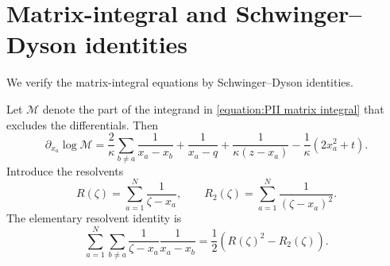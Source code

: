 \documentclass[a4paper,11pt]{article}
\numberwithin{equation}{section}
\begin{document}
\appendix

\section{Matrix-integral and Schwinger--Dyson identities}
\label{appendix:PII matrix integral checks}

We verify the matrix-integral equations by Schwinger--Dyson identities.

Let $\mathcal{M}$ denote the part of the integrand in
\eqref{equation:PII matrix integral} that excludes the differentials.  Then
\begin{equation}
	\label{equation:PII log derivative matrix integrand}
	\partial_{x_{a}}\log\mathcal{M}
	=
	\frac{2}{\kappa}
	\sum_{b\neq a}\frac{1}{x_{a}-x_{b}}
	+\frac{1}{x_{a}-q}
	+\frac{1}{\kappa(z-x_{a})}
	-\frac{1}{\kappa}(2x_{a}^{2}+t).
\end{equation}
Introduce the resolvents
\begin{equation}
	R(\zeta)=\sum_{a=1}^{N}\frac{1}{\zeta-x_{a}},
	\qquad
	R_{2}(\zeta)=\sum_{a=1}^{N}\frac{1}{(\zeta-x_{a})^{2}}.
\end{equation}
The elementary resolvent identity is
\begin{equation}
	\label{equation:PII resolvent pair identity}
	\sum_{a=1}^{N}
	\sum_{b\neq a}
	\frac{1}{\zeta-x_{a}}
	\frac{1}{x_{a}-x_{b}}
	=
	\frac{1}{2}
	\left(
	R(\zeta)^{2}-R_{2}(\zeta)
	\right).
\end{equation}
\end{document}
